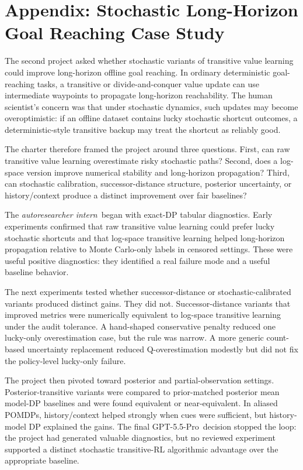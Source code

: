 \documentclass{article}
\newcommand{\intern}{\emph{autoresearcher intern}}
\newcommand{\gptpro}{GPT-5.5-Pro}
\begin{document}



\newpage
\appendix

\section{Appendix: Stochastic Long-Horizon Goal Reaching Case Study}
\label{app:stochastic-long-horizon}

The second project asked whether stochastic variants of transitive value learning could improve long-horizon offline goal reaching. In ordinary deterministic goal-reaching tasks, a transitive or divide-and-conquer value update can use intermediate waypoints to propagate long-horizon reachability. The human scientist's concern was that under stochastic dynamics, such updates may become overoptimistic: if an offline dataset contains lucky stochastic shortcut outcomes, a deterministic-style transitive backup may treat the shortcut as reliably good.

The charter therefore framed the project around three questions. First, can raw transitive value learning overestimate risky stochastic paths? Second, does a log-space version improve numerical stability and long-horizon propagation? Third, can stochastic calibration, successor-distance structure, posterior uncertainty, or history/context produce a distinct improvement over fair baselines?

The \intern\ began with exact-DP tabular diagnostics. Early experiments confirmed that raw transitive value learning could prefer lucky stochastic shortcuts and that log-space transitive learning helped long-horizon propagation relative to Monte Carlo-only labels in censored settings. These were useful positive diagnostics: they identified a real failure mode and a useful baseline behavior.

The next experiments tested whether successor-distance or stochastic-calibrated variants produced distinct gains. They did not. Successor-distance variants that improved metrics were numerically equivalent to log-space transitive learning under the audit tolerance. A hand-shaped conservative penalty reduced one lucky-only overestimation case, but the rule was narrow. A more generic count-based uncertainty replacement reduced Q-overestimation modestly but did not fix the policy-level lucky-only failure.

The project then pivoted toward posterior and partial-observation settings. Posterior-transitive variants were compared to prior-matched posterior mean model-DP baselines and were found equivalent or near-equivalent. In aliased POMDPs, history/context helped strongly when cues were sufficient, but history-model DP explained the gains. The final \gptpro\ decision stopped the loop: the project had generated valuable diagnostics, but no reviewed experiment supported a distinct stochastic transitive-RL algorithmic advantage over the appropriate baseline.
\end{document}
